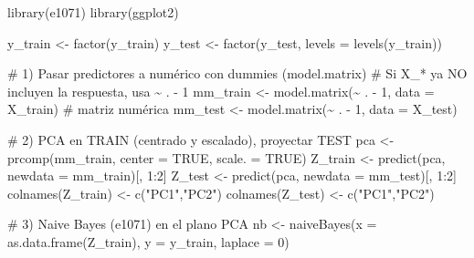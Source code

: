 \documentclass[
  letterpaper,
  DIV=11,
  numbers=noendperiod]{scrartcl}
\newenvironment{Shaded}{\begin{snugshade}}{\end{snugshade}}
\newcommand{\AlertTok}[1]{\textcolor[rgb]{0.68,0.00,0.00}{#1}}
\newcommand{\AttributeTok}[1]{\textcolor[rgb]{0.40,0.45,0.13}{#1}}
\newcommand{\CommentTok}[1]{\textcolor[rgb]{0.37,0.37,0.37}{#1}}
\newcommand{\ConstantTok}[1]{\textcolor[rgb]{0.56,0.35,0.01}{#1}}
\newcommand{\DecValTok}[1]{\textcolor[rgb]{0.68,0.00,0.00}{#1}}
\newcommand{\FunctionTok}[1]{\textcolor[rgb]{0.28,0.35,0.67}{#1}}
\newcommand{\NormalTok}[1]{\textcolor[rgb]{0.00,0.23,0.31}{#1}}
\newcommand{\OtherTok}[1]{\textcolor[rgb]{0.00,0.23,0.31}{#1}}
\newcommand{\SpecialCharTok}[1]{\textcolor[rgb]{0.37,0.37,0.37}{#1}}
\newcommand{\StringTok}[1]{\textcolor[rgb]{0.13,0.47,0.30}{#1}}
\begin{document}
\begin{Shaded}
\begin{Highlighting}[]
\FunctionTok{library}\NormalTok{(e1071)}
\FunctionTok{library}\NormalTok{(ggplot2)}

\NormalTok{y\_train }\OtherTok{\textless{}{-}} \FunctionTok{factor}\NormalTok{(y\_train)}
\NormalTok{y\_test  }\OtherTok{\textless{}{-}} \FunctionTok{factor}\NormalTok{(y\_test, }\AttributeTok{levels =} \FunctionTok{levels}\NormalTok{(y\_train))}

\CommentTok{\# 1) Pasar predictores a numérico con dummies (model.matrix)}
\CommentTok{\#    Si X\_* ya NO incluyen la respuesta, usa \textasciitilde{} . {-} 1}
\NormalTok{mm\_train }\OtherTok{\textless{}{-}} \FunctionTok{model.matrix}\NormalTok{(}\SpecialCharTok{\textasciitilde{}}\NormalTok{ . }\SpecialCharTok{{-}} \DecValTok{1}\NormalTok{, }\AttributeTok{data =}\NormalTok{ X\_train)  }\CommentTok{\# matriz numérica}
\NormalTok{mm\_test  }\OtherTok{\textless{}{-}} \FunctionTok{model.matrix}\NormalTok{(}\SpecialCharTok{\textasciitilde{}}\NormalTok{ . }\SpecialCharTok{{-}} \DecValTok{1}\NormalTok{, }\AttributeTok{data =}\NormalTok{ X\_test)}

\CommentTok{\# 2) PCA en TRAIN (centrado y escalado), proyectar }\AlertTok{TEST}
\NormalTok{pca }\OtherTok{\textless{}{-}} \FunctionTok{prcomp}\NormalTok{(mm\_train, }\AttributeTok{center =} \ConstantTok{TRUE}\NormalTok{, }\AttributeTok{scale. =} \ConstantTok{TRUE}\NormalTok{)}
\NormalTok{Z\_train }\OtherTok{\textless{}{-}} \FunctionTok{predict}\NormalTok{(pca, }\AttributeTok{newdata =}\NormalTok{ mm\_train)[, }\DecValTok{1}\SpecialCharTok{:}\DecValTok{2}\NormalTok{]}
\NormalTok{Z\_test  }\OtherTok{\textless{}{-}} \FunctionTok{predict}\NormalTok{(pca, }\AttributeTok{newdata =}\NormalTok{ mm\_test)[, }\DecValTok{1}\SpecialCharTok{:}\DecValTok{2}\NormalTok{]}
\FunctionTok{colnames}\NormalTok{(Z\_train) }\OtherTok{\textless{}{-}} \FunctionTok{c}\NormalTok{(}\StringTok{"PC1"}\NormalTok{,}\StringTok{"PC2"}\NormalTok{)}
\FunctionTok{colnames}\NormalTok{(Z\_test)  }\OtherTok{\textless{}{-}} \FunctionTok{c}\NormalTok{(}\StringTok{"PC1"}\NormalTok{,}\StringTok{"PC2"}\NormalTok{)}

\CommentTok{\# 3) Naive Bayes (e1071) en el plano PCA}
\NormalTok{nb }\OtherTok{\textless{}{-}} \FunctionTok{naiveBayes}\NormalTok{(}\AttributeTok{x =} \FunctionTok{as.data.frame}\NormalTok{(Z\_train), }\AttributeTok{y =}\NormalTok{ y\_train, }\AttributeTok{laplace =} \DecValTok{0}\NormalTok{)}


\end{Highlighting}
\end{Shaded}
\end{document}

